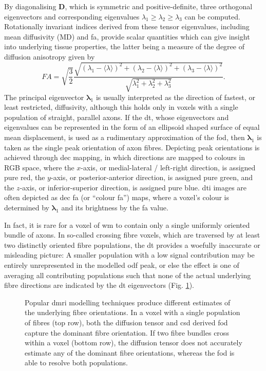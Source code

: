 By diagonalising $\mathbf{D}$, which is symmetric and positive-definite, three orthogonal eigenvectors and corresponding eigenvalues $\lambda_1 \geqslant \lambda_2 \geqslant \lambda_3$ can be computed.
Rotationally invariant indices derived from these tensor eigenvalues, including mean diffusivity (MD) and \gls{fa}, provide scalar quantities which can give insight into underlying tissue properties, the latter being a measure of the degree of diffusion anisotropy given by
\begin{equation}
  FA = \sqrt{\frac{3}{2}}\frac{\sqrt{(\lambda_1 - \langle \lambda \rangle)^2 + (\lambda_2 - \langle \lambda \rangle)^2 + (\lambda_3 - \langle \lambda \rangle)^2}}{\sqrt{\lambda_1^2 + \lambda_2^2+ \lambda_3^2}}.
\end{equation}
The principal eigenvector $\bm{\lambda}_1$ is usually interpreted as the direction of fastest, or least restricted, diffusivity, although this holds only in voxels with a single population of straight, parallel axons.
If the \gls{dt}, whose eigenvectors and eigenvalues can be represented in the form of an ellipsoid shaped surface of equal mean displacement, is used as a rudimentary approximation of the \gls{fod}, then $\bm{\lambda}_1$ is taken as the single peak orientation of axon fibres.
Depicting peak orientations is achieved through \gls{dec} mapping, in which directions are mapped to colours in RGB space, where the $x$-axis, or medial-lateral / left-right direction, is assigned pure red, the $y$-axis, or posterior-anterior direction, is assigned pure green, and the $z$-axis, or inferior-superior direction, is assigned pure blue.
\Gls{dti} images are often depicted as \gls{dec} \gls{fa} (or ``colour \gls{fa}'') maps, where a voxel's colour is determined by $\bm{\lambda}_1$ and its brightness by the \gls{fa} value.

In fact, it is rare for a voxel of \gls{wm} to contain only a single uniformly oriented bundle of axons.
In so-called crossing fibre voxels, which are traversed by at least two distinctly oriented fibre populations, the \gls{dt} provides a woefully inaccurate or misleading picture:
A smaller population with a low signal contribution may be entirely unrepresented in the modelled \gls{odf} peak, or else the effect is one of averaging all contributing populations such that none of the actual underlying fibre directions are indicated by the \gls{dt} eigenvectors (Fig. \ref{fig:cross}).

\begin{figure}
  \centering
  
  \caption[Fibre orientation distribution modelling: Comparison between diffusion tensor and constrained spherical deconvolution]{Popular \gls{dmri} modelling techniques produce different estimates of the underlying fibre orientations. In a voxel with a single population of fibres (top row), both the diffusion tensor and \gls{csd} derived \gls{fod} capture the dominant fibre orientation. If two fibre bundles cross within a voxel (bottom row), the diffusion tensor does not accurately estimate any of the dominant fibre orientations, whereas the \gls{fod} is able to resolve both populations.}
  \label{fig:cross}
\end{figure}

